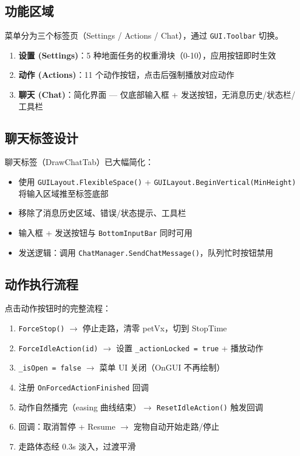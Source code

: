 \documentclass[12pt,a4paper]{ctexart}
\begin{document}
\subsection{功能区域}

菜单分为三个标签页（Settings / Actions / Chat），通过 \texttt{GUI.Toolbar} 切换。

\begin{enumerate}
    \item \textbf{设置 (Settings)}：5 种地面任务的权重滑块（0-10），应用按钮即时生效
    \item \textbf{动作 (Actions)}：11 个动作按钮，点击后强制播放对应动作
    \item \textbf{聊天 (Chat)}：简化界面 — 仅底部输入框 + 发送按钮，无消息历史/状态栏/工具栏
\end{enumerate}

\subsection{聊天标签设计}

聊天标签（DrawChatTab）已大幅简化：

\begin{itemize}
    \item 使用 \texttt{GUILayout.FlexibleSpace()} + \texttt{GUILayout.BeginVertical(MinHeight)} 
          将输入区域推至标签底部
    \item 移除了消息历史区域、错误/状态提示、工具栏
    \item 输入框 + 发送按钮与 \texttt{BottomInputBar} 同时可用
    \item 发送逻辑：调用 \texttt{ChatManager.SendChatMessage()}，队列忙时按钮禁用
\end{itemize}

\subsection{动作执行流程}

点击动作按钮时的完整流程：

\begin{enumerate}
    \item \texttt{ForceStop()} $\to$ 停止走路，清零 petVx，切到 StopTime
    \item \texttt{ForceIdleAction(id)} $\to$ 设置 \texttt{\_actionLocked = true} + 播放动作
    \item \texttt{\_isOpen = false} $\to$ 菜单 UI 关闭（OnGUI 不再绘制）
    \item 注册 \texttt{OnForcedActionFinished} 回调
    \item 动作自然播完（easing 曲线结束）$\to$ \texttt{ResetIdleAction()} 触发回调
    \item 回调：取消暂停 + Resume $\to$ 宠物自动开始走路/停止
    \item 走路体态经 0.3s 淡入，过渡平滑
\end{enumerate}
\end{document}
